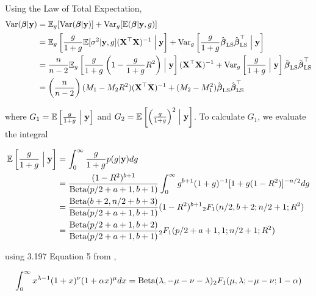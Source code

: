 \noindent Using the Law of Total Expectation,
\begin{align*}
	\text{Var}({\boldsymbol \beta} | {\bf y}) & = \mathbb{E}_g[\text{Var}({\boldsymbol \beta} | {\bf y})] + \text{Var}_g[\mathbb{E}({\boldsymbol \beta}|{\bf y}, g)]                                                                                                                                                 \\
	                   & = \mathbb{E}_g\left[\frac{g}{1 + g} \mathbb{E}[\sigma^2|{\bf y}, g] ({\bf X}^\top {\bf X})^{-1} \Bigm| {\bf y} \right] + \text{Var}_g\left[\frac{g}{1 + g} \hat{{\boldsymbol \beta}}_{\text{LS}} \hat{{\boldsymbol \beta}}_{\text{LS}}^\top \Bigm| {\bf y} \right]                                   \\
	                   & = \frac{n}{n - 2} \mathbb{E}_g\left[\frac{g}{1 + g} \left(1 - \frac{g}{1 + g} R^2 \right) \Bigm| {\bf y} \right] ({\bf X}^\top {\bf X})^{-1} + \text{Var}_g\left[\frac{g}{1 + g} \Bigm| {\bf y} \right] \hat{{\boldsymbol \beta}}_{\text{LS}} \hat{{\boldsymbol \beta}}_{\text{LS}}^\top \\
	                   & = \left( \frac{n}{n - 2} \right) (M_1 - M_2 R^2) ({\bf X}^\top {\bf X})^{-1} + (M_2 - M_1^2) \hat{{\boldsymbol \beta}}_{\text{LS}} \hat{{\boldsymbol \beta}}_{\text{LS}}^\top                                                                                      
\end{align*}

\noindent where $G_1 = \mathbb{E}\left[\frac{g}{1 + g} \Bigm| {\bf y} \right]$ and $G_2 = \mathbb{E}\left[ \left(\frac{g}{1 + g} \right)^2 \Bigm| {\bf y} \right]$. To calculate $G_1$, we evaluate the integral

\begin{align*}
	\mathbb{E}\left[\frac{g}{1 + g} \Bigm| {\bf y} \right] & = \int_0^\infty \frac{g}{1 + g} p(g | {\bf y}) dg                                                                      \\
	                                           & = \frac{(1 - R^2)^{b+1}}{\text{Beta}(p/2 + a + 1, b + 1)} \int_0^\infty g^{b+1} (1 + g)^{-1} [1 + g (1 - R^2)]^{-n/2} dg \\
	                                           & = \frac{\text{Beta}(b + 2, n/2 + b + 3)}{\text{Beta}(p /2 + a + 1, b + 1)} (1 - R^2)^{b+1} {}_2 F_1(n/2, b + 2; n/2 + 1; R^2)  \\
	                                           & = \frac{\text{Beta}(p/2 + a + 1, b + 2)}{\text{Beta}(p /2 + a + 1, b + 1)} {}_2 F_1(p/2 + a + 1, 1; n/2 + 1; R^2)              
\end{align*}

\noindent using 3.197 Equation 5 from \citep{Gradshteyn1988},

\[
	\int_0^\infty x^{\lambda-1} (1+x)^\nu (1 + \alpha x)^{\mu} dx = \text{Beta}(\lambda, -\mu-\nu-\lambda) {}_2 F_1 (\mu, \lambda; -\mu-\nu; 1 - \alpha)
\]

